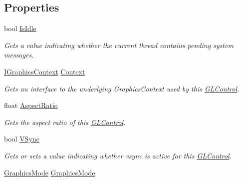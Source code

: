 \subsection*{Properties}
\begin{DoxyCompactItemize}
\item 
bool \hyperlink{class_open_t_k_1_1_g_l_control_a2d5bb8757e5df92cdd364693b0cc98bc}{Is\-Idle}
\begin{DoxyCompactList}\small\item\em Gets a value indicating whether the current thread contains pending system messages. \end{DoxyCompactList}\item 
\hyperlink{interface_open_t_k_1_1_graphics_1_1_i_graphics_context}{I\-Graphics\-Context} \hyperlink{class_open_t_k_1_1_g_l_control_acae65017a5c203cbdc90a65e6ffb2a48}{Context}
\begin{DoxyCompactList}\small\item\em Gets an interface to the underlying Graphics\-Context used by this \hyperlink{class_open_t_k_1_1_g_l_control}{G\-L\-Control}. \end{DoxyCompactList}\item 
float \hyperlink{class_open_t_k_1_1_g_l_control_a1218e6bc4761c69fb2ebf9519830160f}{Aspect\-Ratio}
\begin{DoxyCompactList}\small\item\em Gets the aspect ratio of this \hyperlink{class_open_t_k_1_1_g_l_control}{G\-L\-Control}. \end{DoxyCompactList}\item 
bool \hyperlink{class_open_t_k_1_1_g_l_control_a3dfbcb3e59d3644025432a73ee11f204}{V\-Sync}
\begin{DoxyCompactList}\small\item\em Gets or sets a value indicating whether vsync is active for this \hyperlink{class_open_t_k_1_1_g_l_control}{G\-L\-Control}. \end{DoxyCompactList}\item 
\hyperlink{class_open_t_k_1_1_graphics_1_1_graphics_mode}{Graphics\-Mode} \hyperlink{class_open_t_k_1_1_g_l_control_a09e08e21b3fd710f8b2b310441e414d4}{Graphics\-Mode}

\end{DoxyCompactItemize}
